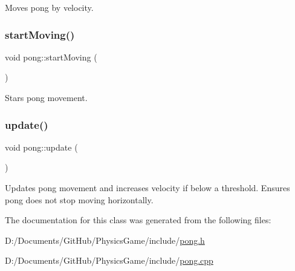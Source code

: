 Moves pong by velocity. 

\mbox{\label{classpong_af5da04e472da35472a1ad0229e36480a}} 
\subsubsection{\texorpdfstring{start\+Moving()}{startMoving()}}
{\footnotesize\ttfamily void pong\+::start\+Moving (\begin{DoxyParamCaption}{ }\end{DoxyParamCaption})}



Stars pong movement. 

\mbox{\label{classpong_a2f36425bd4f142cf23efb4928a49f183}} 
\subsubsection{\texorpdfstring{update()}{update()}}
{\footnotesize\ttfamily void pong\+::update (\begin{DoxyParamCaption}{ }\end{DoxyParamCaption})}



Updates pong movement and increases velocity if below a threshold. Ensures pong does not stop moving horizontally. 



The documentation for this class was generated from the following files\+:\begin{DoxyCompactItemize}
\item 
D\+:/\+Documents/\+Git\+Hub/\+Physics\+Game/include/\hyperlink{pong_8h}{pong.\+h}\item 
D\+:/\+Documents/\+Git\+Hub/\+Physics\+Game/include/\hyperlink{pong_8cpp}{pong.\+cpp}\end{DoxyCompactItemize}
